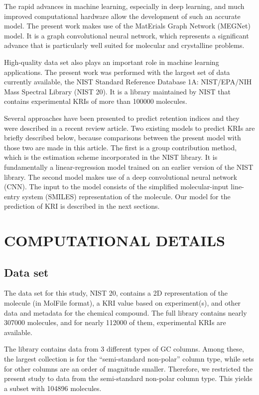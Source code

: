 \documentclass{IEEEcsmag}
\begin{document}
The rapid advances in machine learning, especially in deep learning, and much improved computational hardware allow the development of such an accurate model. The present work makes use of the MatErials Graph Network (MEGNet) model.\cite{2019Chen} It is a graph convolutional neural network, which represents a significant advance that is particularly well suited for molecular and crystalline  problems.\cite{2020Wu}

High-quality data set also plays an important role in machine learning applications. The present work was performed with the largest set of data currently available, the NIST Standard Reference Database 1A: NIST\slash EPA\slash NIH Mass Spectral Library (NIST 20). It is a library maintained by NIST that contains experimental KRIs of more than 100000 molecules.

Several approaches have been presented to predict retention indices and they were described in a recent review article.\cite{2018Zhokhov} Two existing models to predict KRIs are briefly described below, because comparisons between the present model with those two are made in this article. The first is a group contribution method,\cite{2007Stein} which is the estimation scheme incorporated in the NIST library. It is fundamentally a linear-regression model trained on an earlier version of the NIST library.
The second model makes use of a deep convolutional neural network (CNN).\cite{2019Matyushin} The input to the model consists of the simplified molecular-input line-entry system (SMILES) representation of the molecule.
Our model for the prediction of KRI is described in the next sections.

\section{COMPUTATIONAL DETAILS}

\subsection{Data set}

The data set for this study, NIST 20, contains a 2D representation of the molecule (in MolFile format), a KRI value based on experiment(s), and other data and metadata for the chemical compound. The full library contains nearly 307000 molecules, and for nearly 112000 of them, experimental KRIs are available.

The library contains data from 3 different types of GC columns. Among these, the largest collection is for the ``semi-standard non-polar'' column type, while sets for other columns are an order of magnitude smaller. Therefore, we restricted the present study to data from the semi-standard non-polar column type. This yields a subset with 104896 molecules.
\end{document}
